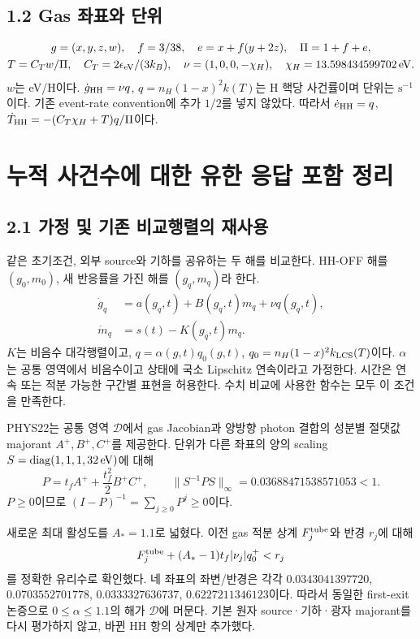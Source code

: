 \documentclass[11pt,a4paper]{article}
\begin{document}
\subsection*{1.2 Gas 좌표와 단위}
\begin{gather}
 g=(x,y,z,w),\quad f=3/38,\quad e=x+f(y+2z),\quad\Pi=1+f+e,\\
 T=C_Tw/\Pi,\quad C_T=2\epsilon_{\mathrm{eV}}/(3k_B),\quad
 \nu=(1,0,0,-\chi_H),\quad \chi_H=13.598434599702\,\mathrm{eV}.
\end{gather}
$w$는 eV/H이다. $\dot g_{\mathrm{HH}}=\nu q$, $q=n_H(1-x)^2k(T)$는 H 핵당 사건률이며 단위는 $\mathrm s^{-1}$이다. 기존 event-rate convention에 추가 $1/2$를 넣지 않았다. 따라서 $\dot e_{\mathrm{HH}}=q$, $\dot T_{\mathrm{HH}}=-(C_T\chi_H+T)q/\Pi$이다.

\newpage
\section{누적 사건수에 대한 유한 응답 포함 정리}
\subsection*{2.1 가정 및 기존 비교행렬의 재사용}
같은 초기조건, 외부 source와 기하를 공유하는 두 해를 비교한다. HH-OFF 해를 $(g_0,m_0)$, 새 반응률을 가진 해를 $(g_q,m_q)$라 한다.
\begin{align}
 \dot g_q&=a(g_q,t)+B(g_q,t)m_q+\nu q(g_q,t),\\
 \dot m_q&=s(t)-K(g_q,t)m_q.
\end{align}
$K$는 비음수 대각행렬이고, $q=\alpha(g,t)q_0(g,t)$,
$q_0=n_H(1-x)^2k_{\rm LCS}(T)$이다. $\alpha$는 공통 영역에서 비음수이고 상태에 국소 Lipschitz 연속이라고 가정한다. 시간은 연속 또는 적분 가능한 구간별 표현을 허용한다. 수치 비교에 사용한 함수는 모두 이 조건을 만족한다.

PHYS22는 공통 영역 $\mathcal D$에서 gas Jacobian과 양방향 photon 결합의 성분별 절댓값 majorant $A^+,B^+,C^+$를 제공한다. 단위가 다른 좌표의 양의 scaling $S=\operatorname{diag}(1,1,1,32\,\mathrm{eV})$에 대해
\begin{equation}
 P=t_fA^++\frac{t_f^2}{2}B^+C^+,\qquad
 \|S^{-1}PS\|_\infty=0.03688471538571053<1.
\end{equation}
$P\ge0$이므로 $(I-P)^{-1}=\sum_{j\ge0}P^j\ge0$이다.

새로운 최대 활성도를 $A_*=1.1$로 넓혔다. 이전 gas 적분 상계 $F_j^{\rm tube}$와 반경 $r_j$에 대해
\begin{equation}
 F_j^{\rm tube}+(A_*-1)t_f|\nu_j|q_0^+<r_j
\end{equation}
를 정확한 유리수로 확인했다. 네 좌표의 좌변/반경은
각각 $0.0343041397720$, $0.0703552701778$, $0.0333327636737$, $0.6227211346123$이다.
따라서 동일한 first-exit 논증으로 $0\le\alpha\le1.1$의 해가 $\mathcal D$에 머문다. 기본 원자 source·기하·광자 majorant를 다시 평가하지 않고, 바뀐 HH 항의 상계만 추가했다.
\end{document}
